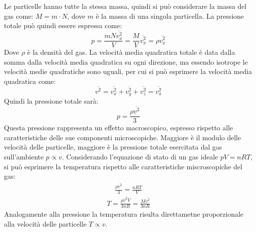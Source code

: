 \documentclass{article}
\numberwithin{equation}{subsection}
\begin{document}
Le particelle hanno tutte la stessa massa, quindi si può 
considerare la massa del gas come: $M=m\cdot N$, dove 
$m$ è la massa di una singola particella.
La pressione totale può quindi essere espressa come:
\begin{equation*}
    p=\displaystyle\frac{mN\overline{v_x^2}}{V}=\frac{M}{V}\overline{v_x^2}=\rho\overline{v_x^2}
\end{equation*}
Dove $\rho$ è la densità del gas. 
La velocità media quadratica totale 
è data dalla somma dalla velocità media quadratica su ogni 
direzione, ma essendo isotrope le velocità medie quadratiche 
sono uguali, per cui si può esprimere la velocità media 
quadratica come:
\begin{equation*}
    \overline{v^2}=\overline{ v_x^2}+\overline{ v_y^2}+\overline{ v_z^2}=\overline{v_x^2}
\end{equation*}
Quindi la pressione totale sarà:
\begin{equation*}
    p=\displaystyle\frac{\rho\overline{ v^2}}{3}
\end{equation*}
Questa pressione rappresenta un effetto macroscopico, espresso 
rispetto alle caratteristiche delle sue componenti microscopiche. 
Maggiore è il modulo delle velocità delle particelle, maggiore 
è la pressione totale esercitata dal gas sull'ambiente $p\propto v$. 
Considerando l'equazione di stato di un gas ideale $pV=nRT$, si può esprimere la temperatura rispetto alle caratteristiche miscroscopiche del gas: 
\begin{gather*}
    \displaystyle\frac{\rho\overline{ v^2}}{3}=\frac{nRT}{V}
\end{gather*}
\begin{gather}
    T=\displaystyle\frac{\rho\bar v^2 V}{3nR}=\frac{M\overline{ v^2}}{3nR}
\end{gather}
Analogamente alla pressione la temperatura risulta direttametne proporzionale alla velocità delle particelle $T\propto v$. 
\end{document}
